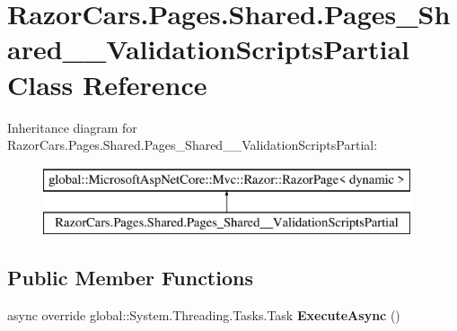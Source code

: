 \hypertarget{class_razor_cars_1_1_pages_1_1_shared_1_1_pages___shared_____validation_scripts_partial}{}\section{Razor\+Cars.\+Pages.\+Shared.\+Pages\+\_\+\+Shared\+\_\+\+\_\+\+Validation\+Scripts\+Partial Class Reference}
\label{class_razor_cars_1_1_pages_1_1_shared_1_1_pages___shared_____validation_scripts_partial}
Inheritance diagram for Razor\+Cars.\+Pages.\+Shared.\+Pages\+\_\+\+Shared\+\_\+\+\_\+\+Validation\+Scripts\+Partial\+:\begin{figure}[H]
\begin{center}
\leavevmode
\includegraphics[height=2.000000cm]{class_razor_cars_1_1_pages_1_1_shared_1_1_pages___shared_____validation_scripts_partial}
\end{center}
\end{figure}
\subsection*{Public Member Functions}
\begin{DoxyCompactItemize}
\item 
\mbox{\label{class_razor_cars_1_1_pages_1_1_shared_1_1_pages___shared_____validation_scripts_partial_a35f154e1ae58221117c08044a9c791d5}} 
async override global\+::\+System.\+Threading.\+Tasks.\+Task {\bfseries Execute\+Async} ()
\end{DoxyCompactItemize}

